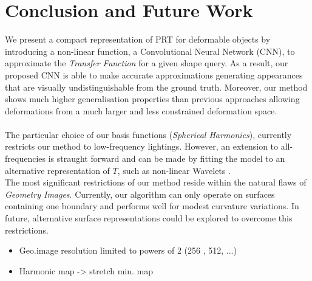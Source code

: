 \section{Conclusion and Future Work}
We present a compact representation of PRT for deformable objects by introducing a non-linear function, a Convolutional Neural Network (CNN), to approximate the \textit{Transfer Function} for a given shape query. As a result, our proposed CNN is able to make accurate approximations generating appearances that are visually undistinguishable from the ground truth. Moreover, our method shows much higher generalisation properties than previous approaches allowing deformations from a much larger and less constrained deformation space.\\
\\
The particular choice of our basis functions (\textit{Spherical Harmonics}), currently restricts our method to low-frequency lightings. However, an extension to all-frequencies is straught forward and can be made by fitting the model to an alternative representation of $T$, such as non-linear Wavelets \cite{AllFrequencyPRT}.\\
The most significant restrictions of our method reside within the natural flaws of \textit{Geometry Images}. Currently, our algorithm can only operate on surfaces containing one boundary and performs well for modest curvature variations. In future, alternative surface representations could be explored to overcome this restrictions.
\begin{itemize}
\item Geo.image resolution limited to powers of 2 (256 , 512, ...)
\item Harmonic map -> stretch min. map
\end{itemize}
